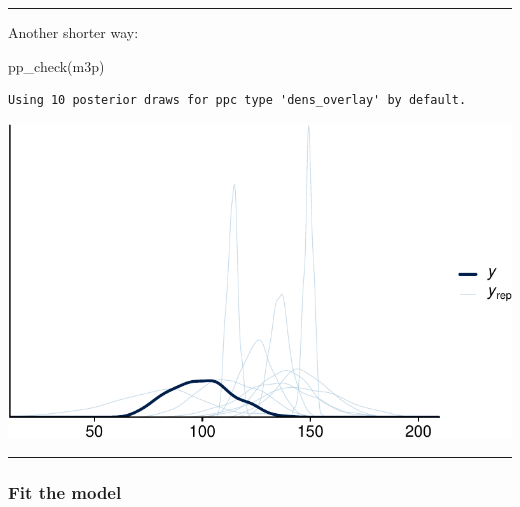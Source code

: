 \documentclass[
  letterpaper,
  DIV=11,
  numbers=noendperiod]{scrartcl}
\newenvironment{Shaded}{\begin{snugshade}}{\end{snugshade}}
\newcommand{\FunctionTok}[1]{\textcolor[rgb]{0.28,0.35,0.67}{#1}}
\newcommand{\NormalTok}[1]{\textcolor[rgb]{0.00,0.23,0.31}{#1}}
\begin{document}
\begin{center}\rule{0.5\linewidth}{0.5pt}\end{center}

Another shorter way:

\begin{Shaded}
\begin{Highlighting}[]
\FunctionTok{pp\_check}\NormalTok{(m3p)}
\end{Highlighting}
\end{Shaded}

\begin{verbatim}
Using 10 posterior draws for ppc type 'dens_overlay' by default.
\end{verbatim}

\includegraphics[width=17.1875in,height=\textheight]{lecture02-1_files/figure-pdf/unnamed-chunk-19-1.pdf}

\begin{center}\rule{0.5\linewidth}{0.5pt}\end{center}

\subsubsection{Fit the model}\label{fit-the-model}
\end{document}
